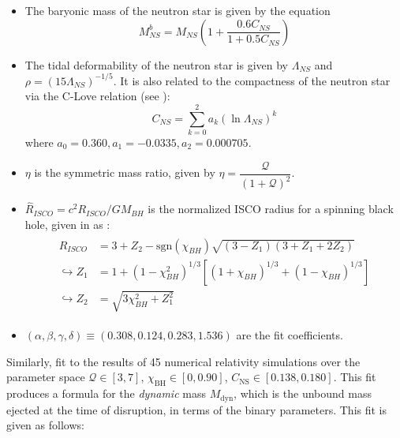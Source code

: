     \begin{itemize}

        \item The baryonic mass of the neutron star is given by the equation $$M_{NS}^b
            = M_{NS} \left(1 + \dfrac{0.6 C_{NS}}{1 + 0.5 C_{NS}} \right)$$

        \item The tidal deformability of the neutron star is given by $\Lambda_{NS}$ and
            $\rho = (15 \Lambda_{NS})^{-1/5}$. It is also related to the compactness of
            the neutron star via the C-Love relation (see \cite{yagi_2017}):
            \begin{equation}
                C_{NS} = \sum_{k=0}^{2} a_k (\ln \Lambda_{NS})^k
            \end{equation}
            where $a_0 = 0.360, a_1 = -0.0335, a_2 = 0.000705$.

        \item $\eta$ is the symmetric mass ratio, given by $ \eta =
            \dfrac{\mathcal{Q}}{(1 + \mathcal{Q})^2} $.

        \item $\hat{R}_{ISCO} = c^2 R_{ISCO} / GM_{BH}$ is the normalized ISCO radius
            for a spinning black hole, given in \cite{bardeen_1972} as :
            \begin{align}
                \begin{split}
                    \hat{R}_{ISCO} &=
                        3 +
                        Z_2 -
                        \mathrm{sgn}(\chi_{BH}) \sqrt{(3 - Z_1)(3+Z_1 + 2Z_2)} \\
                    \hookrightarrow Z_1 &=
                                    1 +
                                    (1 - \chi_{BH}^2)^{1/3}
                                    [(1 + \chi_{BH})^{1/3} + (1 - \chi_{BH})^{1/3}]\\
                    \hookrightarrow Z_2 &=
                                    \sqrt{3\chi_{BH}^2 +  Z_1^2}
                \end{split}
            \end{align}

        \item $(\alpha, \beta, \gamma, \delta) \equiv (0.308, 0.124, 0.283, 1.536)$ are
            the fit coefficients.

    \end{itemize}

    Similarly, \cite{kawaguchi_2016} fit to the results of 45 numerical relativity
    simulations over the parameter space $\mathcal{Q} \in [3,7]$, $\chi_{\mathrm{BH}}
    \in [0, 0.90]$, $C_{\mathrm{NS}} \in [0.138, 0.180]$. This fit produces a formula
    for the \textit{dynamic} mass $M_{\mathrm{dyn}}$, which is the unbound mass ejected
    at the time of disruption, in terms of the binary parameters. This fit is given as
    follows:

